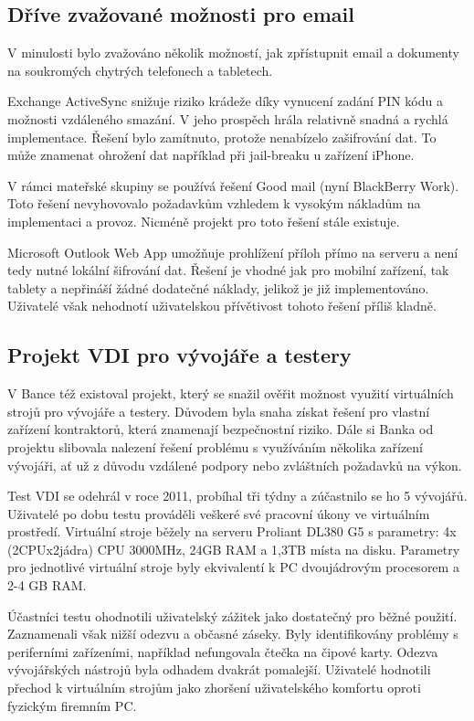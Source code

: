 \subsection{Dříve zvažované možnosti pro email}
V minulosti bylo zvažováno několik možností, jak zpřístupnit email a dokumenty na soukromých chytrých telefonech a tabletech.

Exchange ActiveSync snižuje riziko krádeže díky vynucení zadání PIN kódu a možnosti vzdáleného smazání. V jeho prospěch hrála relativně snadná a rychlá implementace. Řešení bylo zamítnuto, protože nenabízelo zašifrování dat. To může znamenat ohrožení dat například při jail-breaku u zařízení iPhone.

V rámci mateřské skupiny se používá řešení Good mail (nyní BlackBerry Work). Toto řešení nevyhovovalo požadavkům vzhledem k vysokým nákladům na implementaci a provoz. Nicméně projekt pro toto řešení stále existuje.

Microsoft Outlook Web App umožňuje prohlížení příloh přímo na serveru a není tedy nutné lokální šifrování dat. Řešení je vhodné jak pro mobilní zařízení, tak tablety a nepřináší žádné dodatečné náklady, jelikož je již implementováno. Uživatelé však nehodnotí uživatelskou přívětivost tohoto řešení příliš kladně.

\subsection{Projekt VDI pro vývojáře a testery}\label{projektVDI}

V Bance též existoval projekt, který se snažil ověřit možnost využití virtuálních strojů pro vývojáře a testery. Důvodem byla snaha získat řešení pro vlastní zařízení kontraktorů, která znamenají bezpečnostní riziko. Dále si Banka od projektu slibovala nalezení řešení problému s využíváním několika zařízení vývojáři, ať už z důvodu vzdálené podpory nebo zvláštních požadavků na výkon.

Test VDI se odehrál v roce 2011, probíhal tři týdny a zúčastnilo se ho 5 vývojářů. Uživatelé po dobu testu prováděli veškeré své pracovní úkony ve virtuálním prostředí. Virtuální stroje běžely na serveru Proliant DL380 G5 s parametry: 4x (2CPUx2jádra) CPU 3000MHz, 24GB RAM a 1,3TB místa na disku. Parametry pro jednotlivé virtuální stroje byly ekvivalentí k PC dvoujádrovým procesorem a 2-4 GB RAM.

Účastníci testu ohodnotili uživatelský zážitek jako dostatečný pro běžné použití. Zaznamenali však nižší odezvu a občasné záseky. Byly identifikovány problémy s periferními zařízeními, například nefungovala čtečka na čipové karty. Odezva vývojářských nástrojů byla odhadem dvakrát pomalejší. Uživatelé hodnotili přechod k virtuálním strojům jako zhoršení uživatelského komfortu oproti fyzickým firemním PC. 

